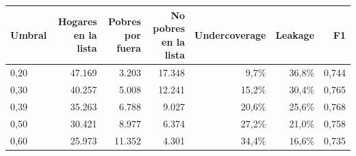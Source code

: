 
\begin{tabular}{lrrrrrr}
\toprule
Umbral & Hogares en la lista & Pobres por fuera & No pobres en la lista & Undercoverage & Leakage & F1\\
\midrule
0,20 & 47.169 & 3.203 & 17.348 & 9,7\% & 36,8\% & 0,744\\
0,30 & 40.257 & 5.008 & 12.241 & 15,2\% & 30,4\% & 0,765\\
0,39 & 35.263 & 6.788 & 9.027 & 20,6\% & 25,6\% & 0,768\\
0,50 & 30.421 & 8.977 & 6.374 & 27,2\% & 21,0\% & 0,758\\
0,60 & 25.973 & 11.352 & 4.301 & 34,4\% & 16,6\% & 0,735\\
\bottomrule
\end{tabular}
